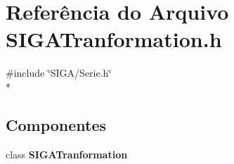 \section{Referência do Arquivo S\+I\+G\+A\+Tranformation.\+h}
\label{_s_i_g_a_tranformation_8h}
{\ttfamily \#include \char`\"{}S\+I\+G\+A/\+Serie.\+h\char`\"{}}\\*
\subsection*{Componentes}
\begin{DoxyCompactItemize}
\item 
class {\bf S\+I\+G\+A\+Tranformation}
\end{DoxyCompactItemize}
